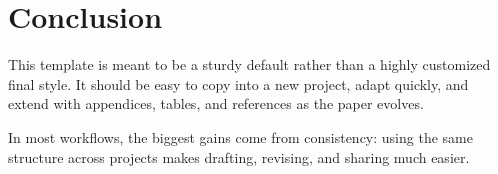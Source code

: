 \section{Conclusion}

This template is meant to be a sturdy default rather than a highly customized final style. It should be easy to copy into a new project, adapt quickly, and extend with appendices, tables, and references as the paper evolves.

In most workflows, the biggest gains come from consistency: using the same structure across projects makes drafting, revising, and sharing much easier.
